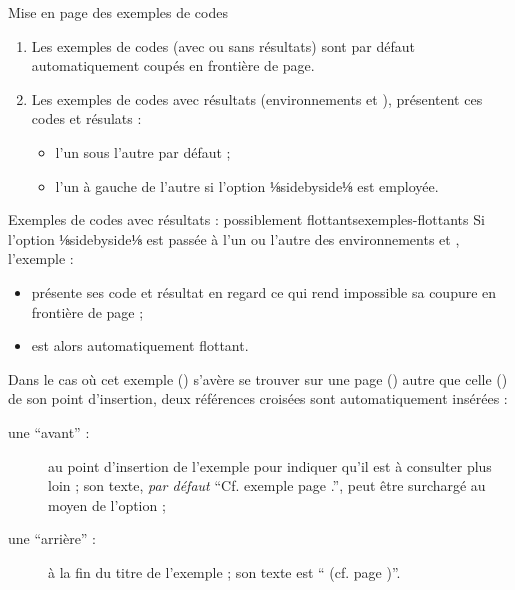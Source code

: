 \documentclass{letgut}
\begin{document}
\begin{dbremark}{Mise en page des exemples de codes}{}
  \begin{enumerate}
  \item Les exemples de codes (avec ou sans résultats) sont par défaut
    automatiquement coupés en frontière de page.
  \item Les exemples de codes avec résultats (environnements
     et ), présentent
    ces codes et résulats :
    \begin{itemize}
    \item l'un sous l'autre par défaut ;
    \item l'un à gauche de l'autre si l'option ⅛sidebyside⅛ est
      employée.
    \end{itemize}
  \end{enumerate}
\end{dbremark}

\begin{dbwarning}{Exemples de codes avec résultats : possiblement
    flottants}{exemples-flottants}
  Si l'option ⅛sidebyside⅛ est passée à l'un ou l'autre des
  environnements  et ,
  l'exemple :
  \begin{itemize}
  \item présente ses code et résultat en regard ce qui rend impossible sa
    coupure en frontière de page ;
  \item est alors automatiquement flottant.
  \end{itemize}
  Dans le cas où cet exemple (\no{}) s'avère se trouver sur une page
  () autre que celle () de son point d'insertion, deux
  références croisées sont automatiquement insérées :
  \begin{description}
  \item[une \enquote{avant} :] au point d'insertion de l'exemple pour indiquer
    qu'il est à consulter plus loin ; son texte, \emph{par défaut}
    \enquote{Cf. exemple  page .}, peut être surchargé au moyen
    de l'option  ;
  \item[une \enquote{arrière} :] à la fin du titre de l'exemple ; son texte est
    \enquote{ (cf. page )}.
  \end{description}
\end{dbwarning}
\end{document}
